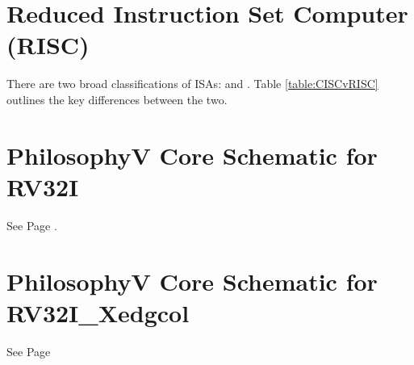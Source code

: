 
\section{Reduced Instruction Set Computer (RISC)}
\label{section:philv_appendix_RISC}
    There are two broad classifications of \glspl{ISA}:  and . Table \ref{table:CISCvRISC} outlines the key differences between the two.

    

\section{PhilosophyV Core Schematic for RV32I}
\label{section:philv_appendix_rv32i_core}
See Page \pageref{fig:philv-core}.

\section{PhilosophyV Core Schematic for RV32I\_Xedgcol}
\label{section:philv_appendix_rv32i_xedgcol_core}
See Page %

\newpage
 
\thispagestyle{empty}
\newpage



\newpage
 
\thispagestyle{empty}
\newpage